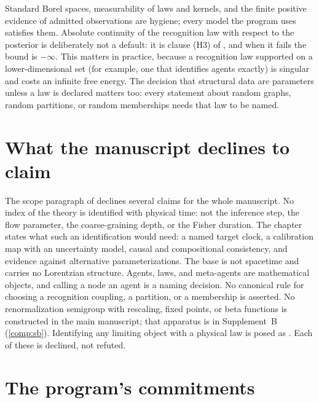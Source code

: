 \begin{hygiene}
Standard Borel spaces, measurability of laws and kernels, and the finite positive evidence of admitted
observations are hygiene; every model the program uses satisfies them. Absolute continuity of the
recognition law with respect to the posterior is deliberately not a default: it is clause (H3) of
, and when it fails the bound is $-\infty$. This matters in practice,
because a recognition law supported on a lower-dimensional set (for example, one that identifies
agents exactly) is singular and costs an infinite free energy. The decision that structural data are
parameters unless a law is declared matters too: every statement about random graphs, random
partitions, or random memberships needs that law to be named.
\end{hygiene}

\section{What the manuscript declines to claim}
\label{comp:ch01-scope}

The scope paragraph of  declines several claims for the whole manuscript. No
index of the theory is identified with physical time: not the inference step, the flow parameter, the
coarse-graining depth, or the Fisher duration. The chapter states what such an identification would
need: a named target clock, a calibration map with an uncertainty model, causal and compositional
consistency, and evidence against alternative parameterizations. The base is not spacetime and
carries no Lorentzian structure. Agents, laws, and meta-agents are mathematical objects, and calling a
node an agent is a naming decision. No canonical rule for choosing a recognition coupling, a
partition, or a membership is asserted. No renormalization semigroup with rescaling, fixed points, or
beta functions is constructed in the main manuscript; that apparatus is in Supplement~B
(\cref{comp:sb}). Identifying any limiting object with a physical law is posed as
. Each of these is declined, not refuted.

\section{The program's commitments}
\label{comp:ch01-commitments}

